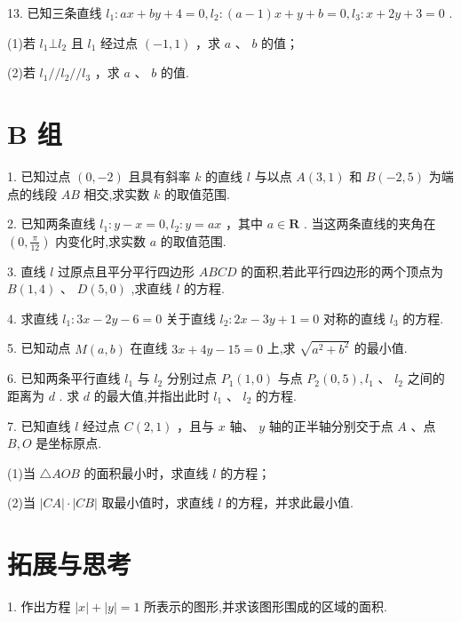 \documentclass[10pt]{article}
\begin{document}
13. 已知三条直线 \({l}_{1} : {ax} + {by} + 4 = 0,{l}_{2} : \left( {a - 1}\right) x + y + b = 0,{l}_{3} : x + {2y} + 3 = 0\) .

(1)若 \({l}_{1} \bot  {l}_{2}\) 且 \({l}_{1}\) 经过点 \(\left( {-1,1}\right)\) ，求 \(a\) 、 \(b\) 的值；

(2)若 \({l}_{1}//{l}_{2}//{l}_{3}\) ，求 \(a\) 、 \(b\) 的值.

\section*{B 组}

1. 已知过点 \(\left( {0, - 2}\right)\) 且具有斜率 \(k\) 的直线 \(l\) 与以点 \(A\left( {3,1}\right)\) 和 \(B\left( {-2,5}\right)\) 为端点的线段 \({AB}\) 相交,求实数 \(k\) 的取值范围.

2. 已知两条直线 \({l}_{1} : y - x = 0,{l}_{2} : y = {ax}\) ，其中 \(a \in  \mathbf{R}\) . 当这两条直线的夹角在 \(\left( {0,\frac{\pi }{12}}\right)\) 内变化时,求实数 \(a\) 的取值范围.

3. 直线 \(l\) 过原点且平分平行四边形 \({ABCD}\) 的面积,若此平行四边形的两个顶点为 \(B\left( {1,4}\right) \text{ 、 }D\left( {5,0}\right)\) ,求直线 \(l\) 的方程.

4. 求直线 \({l}_{1} : {3x} - {2y} - 6 = 0\) 关于直线 \({l}_{2} : {2x} - {3y} + 1 = 0\) 对称的直线 \({l}_{3}\) 的方程.

5. 已知动点 \(M\left( {a,b}\right)\) 在直线 \({3x} + {4y} - {15} = 0\) 上,求 \(\sqrt{{a}^{2} + {b}^{2}}\) 的最小值.

6. 已知两条平行直线 \({l}_{1}\) 与 \({l}_{2}\) 分别过点 \({P}_{1}\left( {1,0}\right)\) 与点 \({P}_{2}\left( {0,5}\right) ,{l}_{1}\text{ 、 }{l}_{2}\) 之间的距离为 \(d\) . 求 \(d\) 的最大值,并指出此时 \({l}_{1}\text{ 、 }{l}_{2}\) 的方程.

7. 已知直线 \(l\) 经过点 \(C\left( {2,1}\right)\) ，且与 \(x\) 轴、 \(y\) 轴的正半轴分别交于点 \(A\) 、点 \(B,O\) 是坐标原点.

(1)当 \(\bigtriangleup  {AOB}\) 的面积最小时，求直线 \(l\) 的方程；

(2)当 \(\left| {CA}\right|  \cdot  \left| {CB}\right|\) 取最小值时，求直线 \(l\) 的方程，并求此最小值.

\section*{拓展与思考}

1. 作出方程 \(\left| x\right|  + \left| y\right|  = 1\) 所表示的图形,并求该图形围成的区域的面积.
\end{document}
